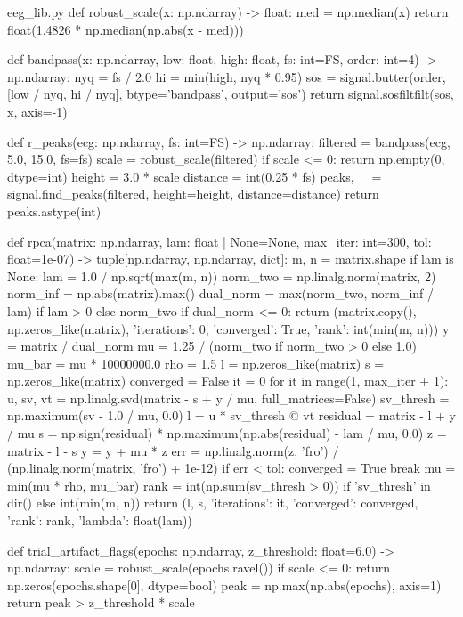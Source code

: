 \documentclass[bwprint]{gmcmthesis}
\begin{document}
\begin{appendices}
\begin{Python}{eeg\_lib.py}
def robust_scale(x: np.ndarray) -> float:
    med = np.median(x)
    return float(1.4826 * np.median(np.abs(x - med)))

def bandpass(x: np.ndarray, low: float, high: float, fs: int=FS, order: int=4) -> np.ndarray:
    nyq = fs / 2.0
    hi = min(high, nyq * 0.95)
    sos = signal.butter(order, [low / nyq, hi / nyq], btype='bandpass', output='sos')
    return signal.sosfiltfilt(sos, x, axis=-1)

def r_peaks(ecg: np.ndarray, fs: int=FS) -> np.ndarray:
    filtered = bandpass(ecg, 5.0, 15.0, fs=fs)
    scale = robust_scale(filtered)
    if scale <= 0:
        return np.empty(0, dtype=int)
    height = 3.0 * scale
    distance = int(0.25 * fs)
    peaks, _ = signal.find_peaks(filtered, height=height, distance=distance)
    return peaks.astype(int)

def rpca(matrix: np.ndarray, lam: float | None=None, max_iter: int=300, tol: float=1e-07) -> tuple[np.ndarray, np.ndarray, dict]:
    m, n = matrix.shape
    if lam is None:
        lam = 1.0 / np.sqrt(max(m, n))
    norm_two = np.linalg.norm(matrix, 2)
    norm_inf = np.abs(matrix).max()
    dual_norm = max(norm_two, norm_inf / lam) if lam > 0 else norm_two
    if dual_norm <= 0:
        return (matrix.copy(), np.zeros_like(matrix), {'iterations': 0, 'converged': True, 'rank': int(min(m, n))})
    y = matrix / dual_norm
    mu = 1.25 / (norm_two if norm_two > 0 else 1.0)
    mu_bar = mu * 10000000.0
    rho = 1.5
    l = np.zeros_like(matrix)
    s = np.zeros_like(matrix)
    converged = False
    it = 0
    for it in range(1, max_iter + 1):
        u, sv, vt = np.linalg.svd(matrix - s + y / mu, full_matrices=False)
        sv_thresh = np.maximum(sv - 1.0 / mu, 0.0)
        l = u * sv_thresh @ vt
        residual = matrix - l + y / mu
        s = np.sign(residual) * np.maximum(np.abs(residual) - lam / mu, 0.0)
        z = matrix - l - s
        y = y + mu * z
        err = np.linalg.norm(z, 'fro') / (np.linalg.norm(matrix, 'fro') + 1e-12)
        if err < tol:
            converged = True
            break
        mu = min(mu * rho, mu_bar)
    rank = int(np.sum(sv_thresh > 0)) if 'sv_thresh' in dir() else int(min(m, n))
    return (l, s, {'iterations': it, 'converged': converged, 'rank': rank, 'lambda': float(lam)})

def trial_artifact_flags(epochs: np.ndarray, z_threshold: float=6.0) -> np.ndarray:
    scale = robust_scale(epochs.ravel())
    if scale <= 0:
        return np.zeros(epochs.shape[0], dtype=bool)
    peak = np.max(np.abs(epochs), axis=1)
    return peak > z_threshold * scale


\end{Python}
\end{appendices}
\end{document}
